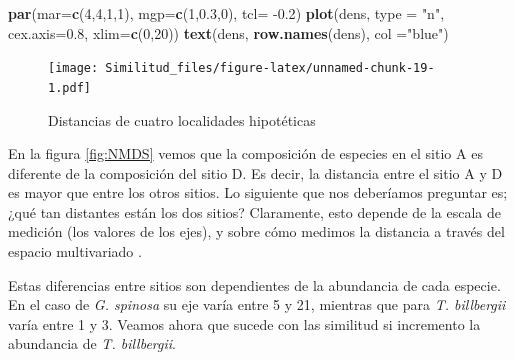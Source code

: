\documentclass[]{book}
\newenvironment{Shaded}{\begin{snugshade}}{\end{snugshade}}
\newcommand{\KeywordTok}[1]{\textcolor[rgb]{0.13,0.29,0.53}{\textbf{{#1}}}}
\newcommand{\DataTypeTok}[1]{\textcolor[rgb]{0.13,0.29,0.53}{{#1}}}
\newcommand{\DecValTok}[1]{\textcolor[rgb]{0.00,0.00,0.81}{{#1}}}
\newcommand{\FloatTok}[1]{\textcolor[rgb]{0.00,0.00,0.81}{{#1}}}
\newcommand{\StringTok}[1]{\textcolor[rgb]{0.31,0.60,0.02}{{#1}}}
\newcommand{\NormalTok}[1]{{#1}}
\begin{document}
\begin{Shaded}
\begin{Highlighting}[]
\KeywordTok{par}\NormalTok{(}\DataTypeTok{mar=}\KeywordTok{c}\NormalTok{(}\DecValTok{4}\NormalTok{,}\DecValTok{4}\NormalTok{,}\DecValTok{1}\NormalTok{,}\DecValTok{1}\NormalTok{), }\DataTypeTok{mgp=}\KeywordTok{c}\NormalTok{(}\DecValTok{1}\NormalTok{,}\FloatTok{0.3}\NormalTok{,}\DecValTok{0}\NormalTok{), }\DataTypeTok{tcl=} \NormalTok{-}\FloatTok{0.2}\NormalTok{)}
\KeywordTok{plot}\NormalTok{(dens, }\DataTypeTok{type =} \StringTok{"n"}\NormalTok{, }\DataTypeTok{cex.axis=}\FloatTok{0.8}\NormalTok{, }\DataTypeTok{xlim=}\KeywordTok{c}\NormalTok{(}\DecValTok{0}\NormalTok{,}\DecValTok{20}\NormalTok{)) }
\KeywordTok{text}\NormalTok{(dens, }\KeywordTok{row.names}\NormalTok{(dens), }\DataTypeTok{col =}\StringTok{"blue"}\NormalTok{)}
\end{Highlighting}
\end{Shaded}

\begin{figure}[htbp]
\centering
\texttt{[image: Similitud\_files/figure-latex/unnamed-chunk-19-1.pdf]}
\caption{\label{fig:unnamed-chunk-19}Distancias de cuatro localidades
hipotéticas}
\end{figure}

En la figura \ref{fig:NMDS} vemos que la composición de especies en el
sitio A es diferente de la composición del sitio D. Es decir, la
distancia entre el sitio A y D es mayor que entre los otros sitios. Lo
siguiente que nos deberíamos preguntar es; ¿qué tan distantes están los
dos sitios? Claramente, esto depende de la escala de medición (los
valores de los ejes), y sobre cómo medimos la distancia a través del
espacio multivariado \citep{Stevens2009}.

Estas diferencias entre sitios son dependientes de la abundancia de cada
especie. En el caso de \emph{G. spinosa} su eje varía entre 5 y 21,
mientras que para \emph{T. billbergii} varía entre 1 y 3. Veamos ahora
que sucede con las similitud si incremento la abundancia de \emph{T.
billbergii}.

\begin{Shaded}
\end{Shaded}
\end{document}
